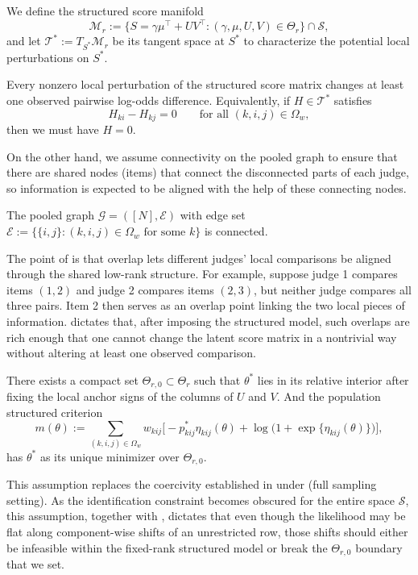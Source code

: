 \documentclass{article}
\begin{document}
\begin{bibunit}[unsrtnat]
We define the structured score manifold
\[\mathcal{M}_r:=\{S=\gamma\mu^\top+UV^\top:(\gamma,\mu,U,V)\in\Theta_r\}
\cap \mathcal{S},
\]
and let $\mathcal{T}^*:=T_{S^*}\mathcal{M}_r$ be its tangent space at $S^*$ to characterize the potential local perturbations on $S^*$.
\begin{assumption}
\label{asm:graph-partial}
Every nonzero local perturbation of the structured score matrix changes at least one observed pairwise log-odds difference. Equivalently, if $H\in\mathcal{T}^*$ satisfies
\[
H_{ki}-H_{kj}=0
\qquad\text{for all }(k,i,j)\in\Omega_w,
\]
then we must have $H=0$.
\end{assumption}
On the other hand, we assume connectivity on the pooled graph to ensure that there are shared nodes (items) that connect the disconnected parts of each judge, so information is expected to be aligned with the help of these connecting nodes.
\begin{assumption}\label{asm:pooled-connect}
    The pooled graph $\mathcal{G}=([N],\mathcal{E})$ with edge set $\mathcal{E}:=\{\{i,j\}:(k,i,j)\in\Omega_w\text{ for some }k\}$ is connected.
\end{assumption}
\begin{remark}
The point of  is that overlap lets different judges' local comparisons be aligned through the shared low-rank structure. For example, suppose judge 1 compares items $(1,2)$ and judge 2 compares items $(2,3)$, but neither judge compares all three pairs. Item 2 then serves as an overlap point linking the two local pieces of information.  dictates that, after imposing the structured model, such overlaps are rich enough that one cannot change the latent score matrix in a nontrivial way without altering at least one observed comparison.
\end{remark}
\begin{assumption}
\label{asm:local-compact}
There exists a compact set $\Theta_{r,0}\subset\Theta_r$ such that $\theta^*$ lies in its relative interior after fixing the local anchor signs of the columns of $U$ and $V$. And the population structured criterion
\[
m(\theta):=\sum_{(k,i,j)\in\Omega_w}w_{kij}\Big[-p_{kij}^*\eta_{kij}(\theta)+\log\big(1+\exp\{\eta_{kij}(\theta)\}\big)\Big],
\]
has $\theta^*$ as its unique minimizer over $\Theta_{r,0}$.
\end{assumption}
This assumption replaces the coercivity established in  under  (full sampling setting). As the identification constraint becomes obscured for the entire space $\mathcal{S}$, this assumption, together with , dictates that even though the likelihood may be flat along component-wise shifts of an unrestricted row, those shifts should either be infeasible within the fixed-rank structured model or break the $\Theta_{r,0}$ boundary that we set.


\end{bibunit}
\end{document}
